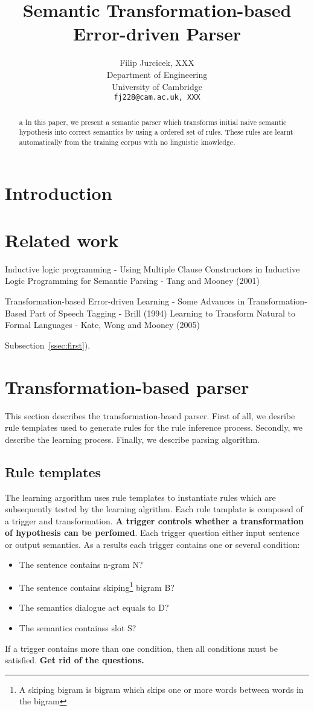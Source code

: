 \documentclass[11pt]{article}
\title{Semantic Transformation-based Error-driven Parser}
\author{Filip Jurcicek, XXX \\
  Department of Engineering \\
  University of Cambridge \\
  {\tt fj228@cam.ac.uk, XXX}}
\date{}
\begin{document}
\maketitle
\begin{abstract}a
  In this paper, we present a semantic parser which transforms initial naive semantic hypothesis into correct semantics by using a ordered set of rules. These rules are learnt automatically from the training corpus with no linguistic knowledge.
\end{abstract}

\section{Introduction}


\section{Related work}

Inductive logic programming - Using Multiple Clause Constructors in Inductive Logic Programming for Semantic Parsing - Tang and Mooney (2001)

Transformation-based Error-driven Learning - Some Advances in Transformation-Based Part of Speech Tagging - Brill (1994)
Learning to Transform Natural to Formal Languages - Kate, Wong and Mooney (2005)

Subsection~\ref{ssec:first}).

\section{Transformation-based parser}
This section describes the transformation-based parser. First of all, we desribe rule templates used to generate rules for the rule inference process. Secondly, we describe the learning process. Finally, we describe parsing algorithm.

\subsection{Rule templates}
The learning argorithm uses rule templates to instantiate rules which are subsequently tested by the learning algrithm. Each rule tamplate is composed of a trigger and transformation. \textbf{A trigger controls whether a transformation of hypothesis can be perfomed}. Each trigger question either input sentence or output semantics. As a results each trigger contains one or several condition:
\begin{itemize}
  \item The sentence contains n-gram N?
  \item The sentence contains skiping\footnote{A skiping bigram is bigram which skips one or more words between words in the bigram} bigram B?
  \item The semantics dialogue act equals to D?
  \item The semantics containss slot S?
\end{itemize}
If a trigger contains more than one condition, then all conditions must be satisfied. \textbf{Get rid of the questions.}
\end{document}
